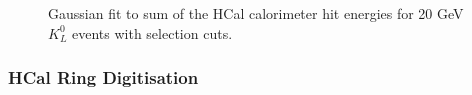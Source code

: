 \begin{figure}
\caption[Gaussian fit to sum of the HCal calorimeter hit energies for 20 GeV $K^{0}_{L}$ events with selection cuts.]{Gaussian fit to sum of the HCal calorimeter hit energies for 20 GeV $K^{0}_{L}$ events with selection cuts.}
\label{fig:hcaldigifit}
\end{figure}


\subsubsection{HCal Ring Digitisation}
\label{sec:hcalringdigi}

